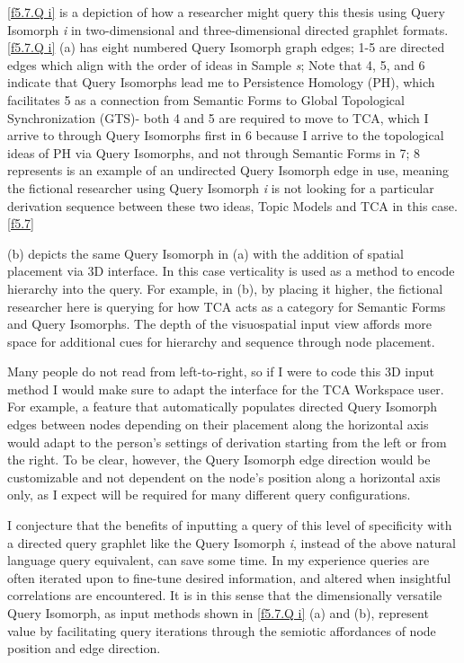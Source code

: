 \autoref{f5.7.Q i} is a depiction of how a researcher might query this thesis using Query Isomorph \textit{i} in two-dimensional and three-dimensional directed graphlet formats. \autoref{f5.7.Q i} (a) has eight numbered Query Isomorph graph edges; 1-5 are directed edges which align with the order of ideas in Sample \textit{s}; Note that 4, 5, and 6 indicate that Query Isomorphs lead me to Persistence Homology (PH), which facilitates 5 as a connection from Semantic Forms to Global Topological Synchronization (GTS)- both 4 and 5 are required to move to TCA, which I arrive to through Query Isomorphs first in 6 because I arrive to the topological ideas of PH via Query Isomorphs, and not through Semantic Forms in 7; 8 represents is an example of an undirected Query Isomorph edge in use, meaning the fictional researcher using Query Isomorph \textit{i} is not looking for a particular derivation sequence between these two ideas, Topic Models and TCA in this case. \autoref{f5.7} 

(b) depicts the same Query Isomorph in (a) with the addition of spatial placement via 3D interface. In this case verticality is used as a method to encode hierarchy into the query. For example, in (b), by placing it higher, the fictional researcher here is querying for how TCA acts as a category for Semantic Forms and Query Isomorphs. The depth of the visuospatial input view affords more space for additional cues for hierarchy and sequence through node placement. 

Many people do not read from left-to-right, so if I were to code this 3D input method I would make sure to adapt the interface for the TCA Workspace user. For example, a feature that automatically populates directed Query Isomorph edges between nodes depending on their placement along the horizontal axis would adapt to the person’s settings of derivation starting from the left or from the right. To be clear, however, the Query Isomorph edge direction would be customizable and not dependent on the node’s position along a horizontal axis only, as I expect will be required for many different query configurations.

   

I conjecture that the benefits of inputting a query of this level of specificity with a directed query graphlet like the Query Isomorph \textit{i}, instead of the above natural language query equivalent, can save some time. In my experience queries are often iterated upon to fine-tune desired information, and altered when insightful correlations are encountered. It is in this sense that the dimensionally versatile Query Isomorph, as input methods shown in \autoref{f5.7.Q i} (a) and (b), represent value by facilitating query iterations through the semiotic affordances of node position and edge direction.





